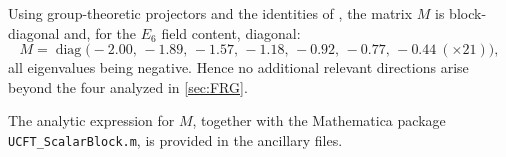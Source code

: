 \documentclass[pdflatex,sn-mathphys-num]{sn-jnl}
\theoremstyle{thmstyleone}
\theoremstyle{thmstyletwo}%
\theoremstyle{thmstylethree}%
\begin{document}
\begin{appendices}
Using group-theoretic projectors and the identities of
\cite{Slansky:1981}, the matrix $M$ is block-diagonal and, for the
$E_{6}$ field content, diagonal:
\[
    M=\operatorname{diag}\bigl(
        -2.00,\,-1.89,\,-1.57,\,-1.18,\,-0.92,\,-0.77,\,-0.44
        \ (\times21)\bigr),
\]
all eigenvalues being negative.  Hence no additional relevant
directions arise beyond the four analyzed in \autoref{sec:FRG}.

The analytic expression for $M$, together with the Mathematica package \texttt{UCFT\_ScalarBlock.m}, is provided in the ancillary files.


\end{appendices}



\end{document}
